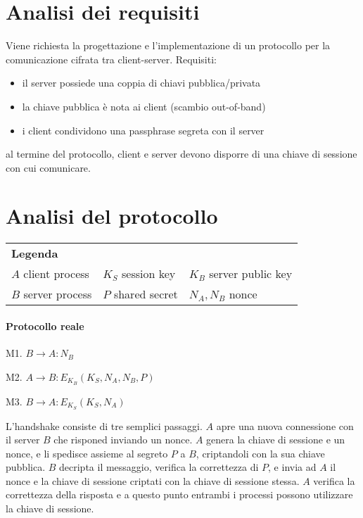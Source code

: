 \documentclass[a4paper]{article}
\title{\Title}
\author{\Author}
\date{\today}
\begin{document}
\maketitle

\section{Analisi dei requisiti}
Viene richiesta la progettazione e l'implementazione di un protocollo per la comunicazione cifrata tra client-server. Requisiti:
\begin{itemize}
\item il server possiede una coppia di chiavi pubblica/privata
\item la chiave pubblica è nota ai client (scambio out-of-band)
\item i client condividono una passphrase segreta con il server
\end{itemize}
al termine del protocollo, client e server devono disporre di una chiave di sessione con cui comunicare.


\section{Analisi del protocollo}

\begin{tabular}{ p{4cm} p{4cm} p{4cm} }
  {\bf Legenda}\\
  $A$     client process &
  $K_S$   session key &
  $K_{B}$ server public key \\

  $B$ server process &
  $P$ shared secret &
  $N_A, N_B$ nonce
\end{tabular}


\paragraph{Protocollo reale}
\begin{list}{}{}
\item M1. $ B \rightarrow A: N_B $
\item M2. $ A \rightarrow B: E_{K_{B}}(K_S, N_A, N_B, P) $
\item M3. $ B \rightarrow A: E_{K_S}(K_S, N_A) $
\end{list}
L'handshake consiste di tre semplici passaggi. $A$ apre una nuova connessione con il server $B$ che risponed inviando un nonce. $A$ genera la chiave di sessione e un nonce, e li spedisce assieme al segreto $P$ a $B$, criptandoli con la sua chiave pubblica. $B$ decripta il messaggio, verifica la correttezza di $P$, e invia ad $A$ il nonce e la chiave di sessione criptati con la chiave di sessione stessa. $A$ verifica la correttezza della risposta e a questo punto entrambi i processi possono utilizzare la chiave di sessione.
\end{document}

